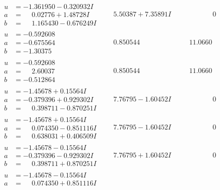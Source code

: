 \documentclass[1p]{elsarticle_modified}
\theoremstyle{definition}
\begin{document}
$$\begin{array}{c|c|c}
\begin{aligned}
u &= -1.361950 - 0.320932 I \\
a &= \phantom{-}0.02776 + 1.48728 I \\
b &= \phantom{-}1.165430 - 0.676249 I\end{aligned}
 & \phantom{-}5.50387 + 7.35891 I & \phantom{-0.000000 } 0 \\ \hline\begin{aligned}
u &= -0.592608\phantom{ +0.000000I} \\
a &= -0.675564\phantom{ +0.000000I} \\
b &= -1.30375\phantom{ +0.000000I}\end{aligned}
 & \phantom{-}0.850544\phantom{ +0.000000I} & \phantom{-}11.0660\phantom{ +0.000000I} \\ \hline\begin{aligned}
u &= -0.592608\phantom{ +0.000000I} \\
a &= \phantom{-}2.60037\phantom{ +0.000000I} \\
b &= -0.512864\phantom{ +0.000000I}\end{aligned}
 & \phantom{-}0.850544\phantom{ +0.000000I} & \phantom{-}11.0660\phantom{ +0.000000I} \\ \hline\begin{aligned}
u &= -1.45678 + 0.15564 I \\
a &= -0.379396 + 0.929302 I \\
b &= \phantom{-}0.398711 - 0.870251 I\end{aligned}
 & \phantom{-}7.76795 - 1.60452 I & \phantom{-0.000000 } 0 \\ \hline\begin{aligned}
u &= -1.45678 + 0.15564 I \\
a &= \phantom{-}0.074350 - 0.851116 I \\
b &= \phantom{-}0.638031 + 0.406509 I\end{aligned}
 & \phantom{-}7.76795 - 1.60452 I & \phantom{-0.000000 } 0 \\ \hline\begin{aligned}
u &= -1.45678 - 0.15564 I \\
a &= -0.379396 - 0.929302 I \\
b &= \phantom{-}0.398711 + 0.870251 I\end{aligned}
 & \phantom{-}7.76795 + 1.60452 I & \phantom{-0.000000 } 0 \\ \hline\begin{aligned}
u &= -1.45678 - 0.15564 I \\
a &= \phantom{-}0.074350 + 0.851116 I \\

\end{aligned}
\end{array}$$
\end{document}
